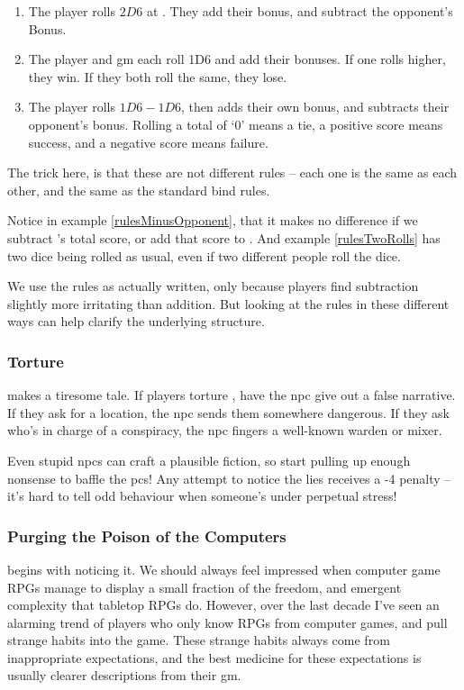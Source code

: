 \begin{multicols}{2}
\begin{enumerate}
  \item
  The player rolls $2D6$ at \tn[7].
  They add their bonus, and subtract the opponent's Bonus.
  \label{rulesMinusOpponent}
  \item
  The player and \gls{gm} each roll 1D6 and add their bonuses.
  If one rolls higher, they win.
  If they both roll the same, they lose.
  \label{rulesTwoRolls}
  \item
  The player rolls $1D6-1D6$, then adds their own bonus, and subtracts their opponent's bonus.
  Rolling a total of `0' means a tie, a positive score means success, and a negative score means failure.
  \label{rulesMinusDie}
\end{enumerate}

The trick here, is that these are not different rules -- each one is the same as each other, and the same as the standard \gls{bind} rules.

Notice in example \ref{rulesMinusOpponent}, that it makes no difference if we subtract 's total score, or add that score to .
And example \ref{rulesTwoRolls} has two dice being rolled as usual, even if two different people roll the dice.

We use the rules as actually written, only because players find subtraction slightly more irritating than addition.
But looking at the rules in these different ways can help clarify the underlying structure.

\subsubsection{Torture}
makes a tiresome tale.
If players torture , have the \gls{npc} give out a false narrative.
If they ask for a location, the \gls{npc} sends them somewhere dangerous.
If they ask who's in charge of a conspiracy, the \gls{npc} fingers a well-known \gls{warden} or \gls{mixer}.

Even stupid \glspl{npc} can craft a plausible fiction, so start pulling up enough nonsense to baffle the \glspl{pc}!
Any attempt to notice the lies receives a -4 penalty -- it's hard to tell odd behaviour when someone's under perpetual stress!

\subsubsection{Purging the Poison of the Computers}
begins with noticing it.
We should always feel impressed when computer game RPGs manage to display a small fraction of the freedom, and emergent complexity that tabletop RPGs do.
However, over the last decade I've seen an alarming trend of players who only know RPGs from computer games, and pull strange habits into the game.
These strange habits always come from inappropriate expectations, and the best medicine for these expectations is usually clearer descriptions from their \gls{gm}.


\end{multicols}
